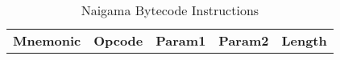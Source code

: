 
\begin{table}[]
\centering
\caption{Naigama Bytecode Instructions}
\label{tab:naig_bytecode}
\begin{tabular}{lllll}
\textbf{Mnemonic} & \textbf{Opcode} & \textbf{Param1} & \textbf{Param2} & \textbf{Length} \\
\end{tabular}
\end{table}
